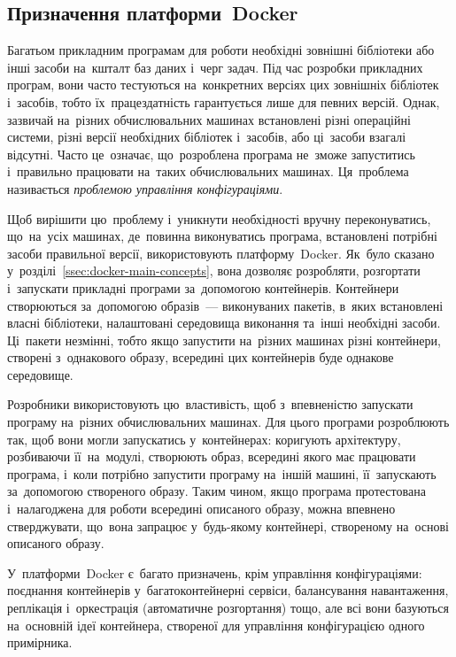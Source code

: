 \documentclass[
	a4paper,
	oneside,
	BCOR = 10mm,
	DIV = 12,
	12pt,
	headings = normal,
]{scrartcl}
\begin{document}
			\subsection{Призначення платформи~\textenglish{Docker}}
				Багатьом прикладним програмам для роботи необхідні зовнішні бібліотеки або інші засоби на~кшталт баз даних і~черг задач. Під час розробки прикладних програм, вони часто тестуються на~конкретних версіях цих зовнішніх бібліотек і~засобів, тобто їх~працездатність гарантується лише для певних версій. Однак, зазвичай на~різних обчислювальних машинах встановлені різні операційні системи, різні версії необхідних бібліотек і~засобів, або ці~засоби взагалі відсутні. Часто це~означає, що~розроблена програма не~зможе запуститись і~правильно працювати на~таких обчислювальних машинах. Ця~проблема називається \emph{проблемою управління конфігураціями}.

				Щоб вирішити цю~проблему і~уникнути необхідності вручну переконуватись, що~на~усіх машинах, де~повинна виконуватись програма, встановлені потрібні засоби правильної версії, використовують платформу~\textenglish{Docker}. Як~було сказано у~розділі~\ref{ssec:docker-main-concepts}, вона дозволяє розробляти, розгортати і~запускати прикладні програми за~допомогою контейнерів. Контейнери створюються за~допомогою образів~— виконуваних пакетів, в~яких встановлені власні бібліотеки, налаштовані середовища виконання та~інші необхідні засоби. Ці~пакети незмінні, тобто якщо запустити на~різних машинах різні контейнери, створені з~однакового образу, всередині цих контейнерів буде однакове середовище.
				
				Розробники використовують цю~властивість, щоб з~впевненістю запускати програму на~різних обчислювальних машинах. Для цього програми розроблюють так, щоб вони могли запускатись у~контейнерах: коригують архітектуру, розбиваючи її~на~модулі, створюють образ, всередині якого має працювати програма, і~коли потрібно запустити програму на~іншій машині, її~запускають за~допомогою створеного образу. Таким чином, якщо програма протестована і~налагоджена для роботи всередині описаного образу, можна впевнено стверджувати, що~вона запрацює у~будь-якому контейнері, створеному на~основі описаного образу.

				У~платформи~\textenglish{Docker} є~багато призначень, крім управління конфігураціями: поєднання контейнерів у~багатоконтейнерні сервіси, балансування навантаження, реплікація і~оркестрація (автоматичне розгортання) тощо, але всі вони базуються на~основній ідеї контейнера, створеної для управління конфігурацією одного примірника.
\end{document}
